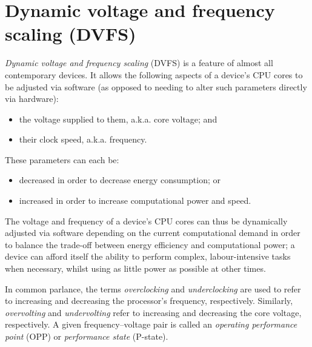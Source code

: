 \section{Dynamic voltage and frequency scaling (DVFS)}

\emph{Dynamic voltage and frequency scaling} (DVFS) is a feature of almost all
contemporary devices. It allows the following aspects of a device's CPU cores
to be adjusted via software (as opposed to needing to alter such parameters
directly via hardware):

\begin{itemize}
    \item the voltage supplied to them, a.k.a. core voltage; and
    \item their clock speed, a.k.a. frequency.
\end{itemize}

These parameters can each be:

\begin{itemize}
    \item decreased in order to decrease energy consumption; or
    \item increased in order to increase computational power and speed.
\end{itemize}

The voltage and frequency of a device's CPU cores can thus be dynamically
adjusted via software depending on the current computational demand in order to
balance the trade-off between energy efficiency and computational power; a
device can afford itself the ability to perform complex, labour-intensive tasks
when necessary, whilst using as little power as possible at other times.

In common parlance, the terms \emph{overclocking} and \emph{underclocking} are
used to refer to increasing and decreasing the processor's frequency,
respectively. Similarly, \emph{overvolting} and \emph{undervolting} refer to
increasing and decreasing the core voltage, respectively. A given
frequency–voltage pair is called an \emph{operating performance point} (OPP)
or \emph{performance state} (P-state).
